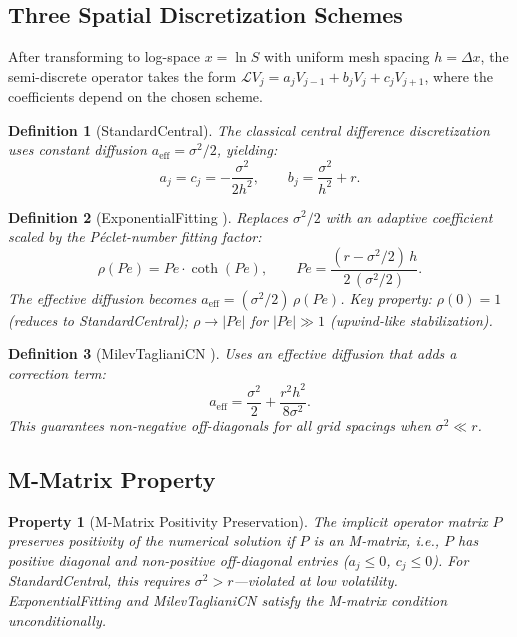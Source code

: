 \documentclass[11pt]{article}
\newtheorem{property}{Property}
\newtheorem{definition}{Definition}
\begin{document}
\subsection{Three Spatial Discretization Schemes}

After transforming to log-space $x = \ln S$ with uniform mesh spacing
$h = \Delta x$, the semi-discrete operator takes the form
$\mathcal{L}V_j = a_j V_{j-1} + b_j V_j + c_j V_{j+1}$, where the
coefficients depend on the chosen scheme.

\begin{definition}[StandardCentral]
The classical central difference discretization uses constant diffusion
$a_{\mathrm{eff}} = \sigma^2/2$, yielding:
\begin{equation}
  a_j = c_j = -\frac{\sigma^2}{2h^2}, \qquad
  b_j = \frac{\sigma^2}{h^2} + r.
  \label{eq:sc}
\end{equation}
\end{definition}

\begin{definition}[ExponentialFitting \cite{Duffy2004}]
Replaces $\sigma^2/2$ with an adaptive coefficient scaled by the
P\'eclet-number fitting factor:
\begin{equation}
  \rho(Pe) = Pe \cdot \coth(Pe),
  \qquad Pe = \frac{(r - \sigma^2/2)\,h}{2\,(\sigma^2/2)}.
  \label{eq:ef}
\end{equation}
The effective diffusion becomes $a_{\mathrm{eff}} = (\sigma^2/2)\,\rho(Pe)$.
Key property: $\rho(0) = 1$ (reduces to StandardCentral); $\rho \to |Pe|$
for $|Pe| \gg 1$ (upwind-like stabilization).
\end{definition}

\begin{definition}[MilevTaglianiCN \cite{MilevTagliani2010a}]
Uses an effective diffusion that adds a correction term:
\begin{equation}
  a_{\mathrm{eff}} = \frac{\sigma^2}{2}
    + \frac{r^2 h^2}{8\sigma^2}.
  \label{eq:mt}
\end{equation}
This guarantees non-negative off-diagonals for all grid spacings when
$\sigma^2 \ll r$.
\end{definition}

\subsection{M-Matrix Property}

\begin{property}[M-Matrix Positivity Preservation]
\label{prop:mmatrix}
The implicit operator matrix $P$ preserves positivity of the numerical
solution if $P$ is an M-matrix, i.e., $P$ has positive diagonal and
non-positive off-diagonal entries ($a_j \leq 0$, $c_j \leq 0$).
For StandardCentral, this requires $\sigma^2 > r$---violated at low
volatility. ExponentialFitting and MilevTaglianiCN satisfy the M-matrix
condition unconditionally.
\end{property}
\end{document}
